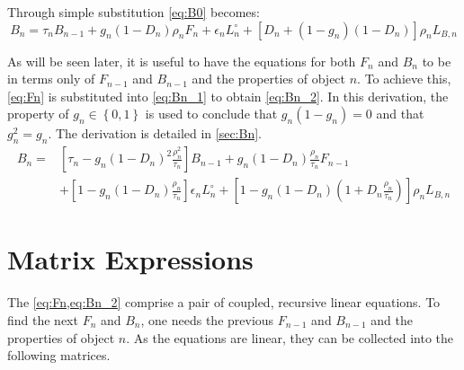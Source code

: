 \documentclass[11pt,a4paper]{article}
\begin{document}
Through simple substitution \cref{eq:B0} becomes:
\begin{equation}\label{eq:Bn_1}
	B_n = \tau_n B_{n-1} + g_n \left(1 - D_n\right) \rho_n F_n + \epsilon_n L^\circ_n + \left[D_n + \left(1 - g_n\right)\left(1 - D_n\right)\right] \rho_n L_{B,n}
\end{equation}

As will be seen later, it is useful to have the equations for both $ F_n $ and $ B_n $ to be in terms only of $ F_{n-1} $ and $ B_{n-1} $ and the properties of object $ n $. To achieve this, \cref{eq:Fn} is substituted into \cref{eq:Bn_1} to obtain \cref{eq:Bn_2}. In this derivation, the property of $ g_n \in \left\{0,1\right\} $ is used to conclude that $ g_n \left(1 - g_n\right) = 0 $ and that $ g_n^2 = g_n $. The derivation is detailed in \cref{sec:Bn}.
\begin{equation}\label{eq:Bn_2}
\begin{split}
	B_n = & 
		\left[ \tau_n - g_n \left(1 - D_n\right)^2 \frac{\rho_n^2}{\tau_n} \right] B_{n-1}
		+ g_n \left(1 - D_n\right) \frac{\rho_n}{\tau_n} F_{n-1} \\&
		+ \left[ 1 - g_n \left(1 - D_n\right) \frac{\rho_n}{\tau_n} \right] \epsilon_n L^\circ_n
		+ \left[1 - g_n \left( 1 - D_n \right) \left(1 + D_n \frac{\rho_n}{\tau_n}\right) \right] \rho_n L_{B,n}
\end{split}
\end{equation}

\section{Matrix Expressions}

The \cref{eq:Fn,eq:Bn_2} comprise a pair of coupled, recursive linear equations. To find the next $ F_n $ and $ B_n $, one needs the previous $ F_{n-1} $ and $ B_{n-1} $ and the properties of object $ n $. As the equations are linear, they can be collected into the following matrices.
\end{document}
